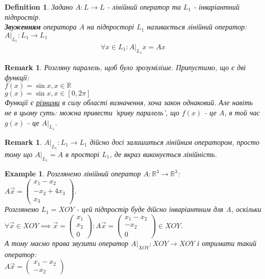 \documentclass[a4paper, 10pt]{article}
\theoremstyle{theoremdd}
\newtheorem{definition}[theorem]{Definition}
\newtheorem{example}[theorem]{Example}
\newtheorem{remark}[theorem]{Remark}
\begin{document}
\begin{definition}
Задано $A \colon L \to L$ - лінійний оператор та $L_1$ - інваріантний підпростір.\\
\textbf{Звуженням} оператора $A$ на підпросторі $L_1$ називається лінійний оператор: $A |_{L_1} \colon L_1 \to L_1$
\begin{align*}
\forall x \in L_1: A |_{L_1}x = Ax
\end{align*}
\end{definition}

\begin{remark}
Розгляну паралель, щоб було зрозуміліше. Припустимо, що є дві функції:\\
$f(x) = \sin x, x \in \mathbb{R}$\\
$g(x) = \sin x, x \in [0,2\pi]$\\
Функції є \underline{різними} в силу області визначення, хоча закон однаковий. Але навіть не в цьому суть: можна привести 'криву паралель', що $f(x)$ - це $A$, в той час $g(x)$ - це $A |_{L_1}$.
\end{remark}

\begin{remark}
$A|_{L_1} \colon L_1 \to L_1$ дійсно досі залишиться лінійним оператором, просто тому що $A|_{L_1} = A$ в просторі $L_1$, де якраз виконується лінійність.
\end{remark}

\iffalse
\begin{example}
Розглянемо лінійний оператор $A \colon \mathbb{R}^3 \to \mathbb{R}^3$:\\
$A \vec{x} = \begin{pmatrix}
x_1 - x_2 \\ -x_2 + 4x_3 \\ x_3
\end{pmatrix}$.\\
Розглянемо $L_1 = XOY$ - цей підпростір буде дійсно інваріантним для $A$, оскільки\\
$\forall \vec{x} \in XOY \implies \vec{x} = \begin{pmatrix}
x_1 \\ x_2 \\ 0
\end{pmatrix}: A \vec{x} = \begin{pmatrix}
x_1 - x_2 \\ -x_2 \\ 0
\end{pmatrix} \in XOY$.\\
А тому маємо права звузити оператор $A|_{XOY}: XOY \to XOY$ і отримати такий оператор:\\
$A \vec{x} = \begin{pmatrix}
x_1 - x_2 \\ -x_2
\end{pmatrix}$
\end{example}
\end{document}

